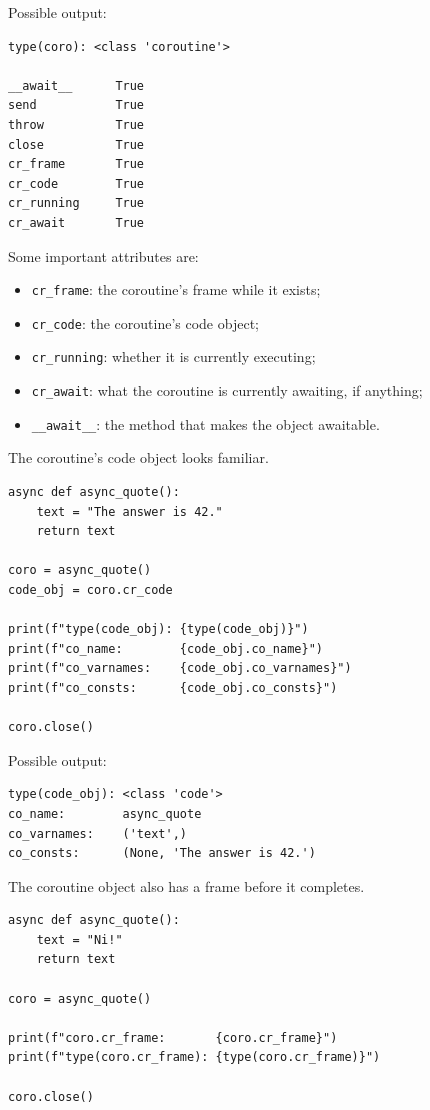 Possible output:

\begin{verbatim}
type(coro): <class 'coroutine'>

__await__      True
send           True
throw          True
close          True
cr_frame       True
cr_code        True
cr_running     True
cr_await       True
\end{verbatim}

Some important attributes are:

\begin{itemize}
    \item \texttt{cr\_frame}: the coroutine's frame while it exists;
    \item \texttt{cr\_code}: the coroutine's code object;
    \item \texttt{cr\_running}: whether it is currently executing;
    \item \texttt{cr\_await}: what the coroutine is currently awaiting, if anything;
    \item \texttt{\_\_await\_\_}: the method that makes the object awaitable.
\end{itemize}

The coroutine's code object looks familiar.

\begin{verbatim}
async def async_quote():
    text = "The answer is 42."
    return text

coro = async_quote()
code_obj = coro.cr_code

print(f"type(code_obj): {type(code_obj)}")
print(f"co_name:        {code_obj.co_name}")
print(f"co_varnames:    {code_obj.co_varnames}")
print(f"co_consts:      {code_obj.co_consts}")

coro.close()
\end{verbatim}

Possible output:

\begin{verbatim}
type(code_obj): <class 'code'>
co_name:        async_quote
co_varnames:    ('text',)
co_consts:      (None, 'The answer is 42.')
\end{verbatim}

The coroutine object also has a frame before it completes.

\begin{verbatim}
async def async_quote():
    text = "Ni!"
    return text

coro = async_quote()

print(f"coro.cr_frame:       {coro.cr_frame}")
print(f"type(coro.cr_frame): {type(coro.cr_frame)}")

coro.close()
\end{verbatim}

